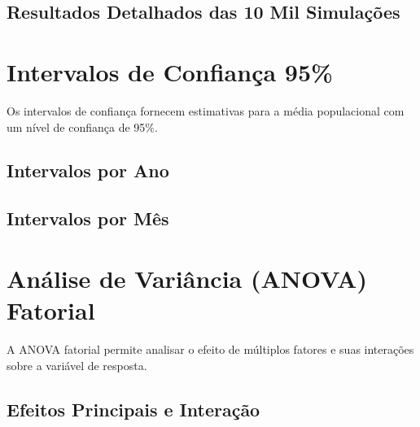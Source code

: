\documentclass[12pt,a4paper]{article}
\begin{document}


\subsection{Resultados Detalhados das 10 Mil Simulações}



\section{Intervalos de Confiança 95\%}

Os intervalos de confiança fornecem estimativas para a média populacional 
com um nível de confiança de 95\%.

\subsection{Intervalos por Ano}



\newpage

\subsection{Intervalos por Mês}



\section{Análise de Variância (ANOVA) Fatorial}

A ANOVA fatorial permite analisar o efeito de múltiplos fatores e suas 
interações sobre a variável de resposta.

\subsection{Efeitos Principais e Interação}
\end{document}

